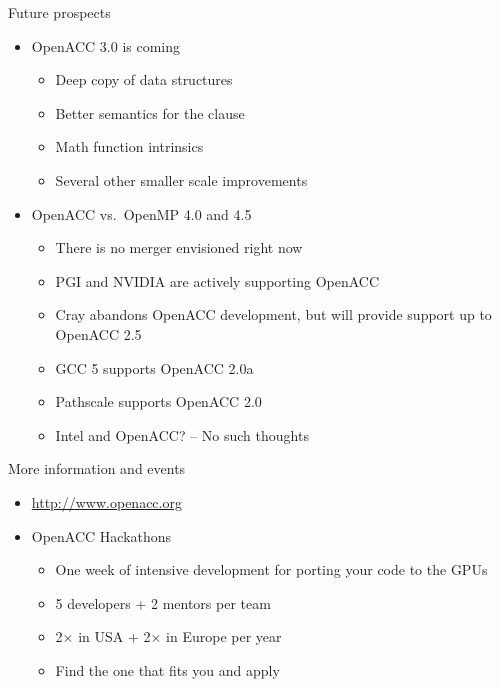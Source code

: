 \documentclass[12pt,aspectratio=169]{beamer}
\begin{document}
\begin{frame}{Future prospects}
  \begin{itemize}
  \item OpenACC 3.0 is coming
    \begin{itemize}
    \item Deep copy of data structures
    \item Better semantics for the  clause
    \item Math function intrinsics
    \item Several other smaller scale improvements
    \end{itemize}
  \item OpenACC vs.\ OpenMP 4.0 and 4.5
    \begin{itemize}
    \item There is no merger envisioned right now
    \item PGI and NVIDIA are actively supporting OpenACC
    \item Cray abandons OpenACC development, but will provide support up to
      OpenACC 2.5
    \item GCC 5 supports OpenACC 2.0a
    \item Pathscale supports OpenACC 2.0
    \item Intel and OpenACC? -- No such thoughts
    \end{itemize}
  \end{itemize}
\end{frame}

\begin{frame}{More information and events}
  \begin{itemize}
  \item \url{http://www.openacc.org}
  \item OpenACC Hackathons
    \begin{itemize}
    \item One week of intensive development for porting your code to the GPUs
    \item 5 developers + 2 mentors per team
    \item 2$\times$ in USA + 2$\times$ in Europe per year
    \item Find the one that fits you and apply
    \end{itemize}
  \end{itemize}
\end{frame}

\end{document}
